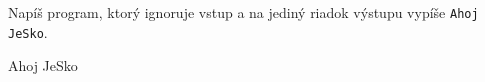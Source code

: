 




Napíš program, ktorý ignoruje vstup a na jediný riadok výstupu vypíše \texttt{Ahoj JeSko}.

\vstup
\vystup
Ahoj JeSko
\koniec


